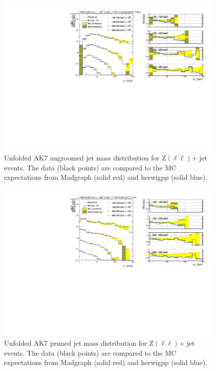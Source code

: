 \begin{figure}[!htb]
\includegraphics[width=0.99\textwidth]{figs/Zll/jetmassunf_ak7_log.pdf}
\caption{Unfolded AK7 ungroomed jet mass distribution for Z$(\ell\ell)$+ jet events. The data (black points) are compared to the MC expectations from Madgraph (solid red) and herwigpp (solid blue).}
\label{figs:AK7ZmmInt1}
\end{figure}

\begin{figure}[!htb]
\includegraphics[width=0.99\textwidth]{figs/Zll/jetmassunf_ak7pr_log.pdf}
\caption{Unfolded AK7 pruned jet mass distribution for Z$(\ell\ell)$+ jet events. The data (black points) are compared to the MC expectations from Madgraph (solid red) and herwigpp (solid blue).}
\label{figs:AK7ZmmInt2}
\end{figure}

